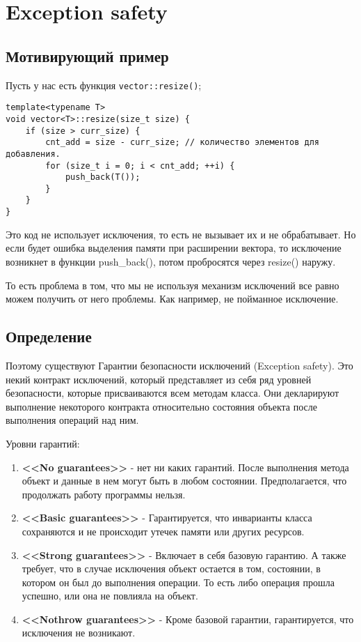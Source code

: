 \section{Exception safety}
\subsection{Мотивирующий пример}
Пусть у нас есть функция \texttt{vector::resize()};

\begin{verbatim}
template<typename T>
void vector<T>::resize(size_t size) {
    if (size > curr_size) {
        cnt_add = size - curr_size; // количество элементов для добавления.
        for (size_t i = 0; i < cnt_add; ++i) {
            push_back(T());
        }
    }
}
\end{verbatim}


Это код не использует исключения, то есть не вызывает их и не обрабатывает. Но если будет ошибка выделения памяти при расширении вектора, то исключение возникнет в функции push\_back(), потом пробросятся через resize() наружу.

То есть проблема в том, что мы не используя механизм исключений все равно можем получить от него проблемы. Как например, не пойманное исключение.

\subsection{Определение}

Поэтому существуют Гарантии безопасности исключений (Exception safety). Это некий контракт исключений, который представляет из себя ряд уровней безопасности, которые присваиваются всем методам класса. Они декларируют выполнение некоторого контракта относительно состояния объекта после выполнения операций над ним.

Уровни гарантий:
\begin{enumerate}
\item \textbf{<<No guarantees>>} - нет ни каких гарантий. После выполнения метода объект и данные в нем могут быть в любом состоянии. Предполагается, что продолжать работу программы нельзя.
\item \textbf{<<Basic guarantees>>} - Гарантируется, что инварианты класса сохраняются и не происходит утечек памяти или других ресурсов.
\item \textbf{<<Strong guarantees>>} - Включает в себя базовую гарантию. А также требует, что в случае исключения объект остается в том, состоянии, в котором он был до выполнения операции. То есть либо операция прошла успешно, или она не повлияла на объект.
\item \textbf{<<Nothrow guarantees>>} - Кроме базовой гарантии, гарантируется, что исключения не возникают.
\end{enumerate}

